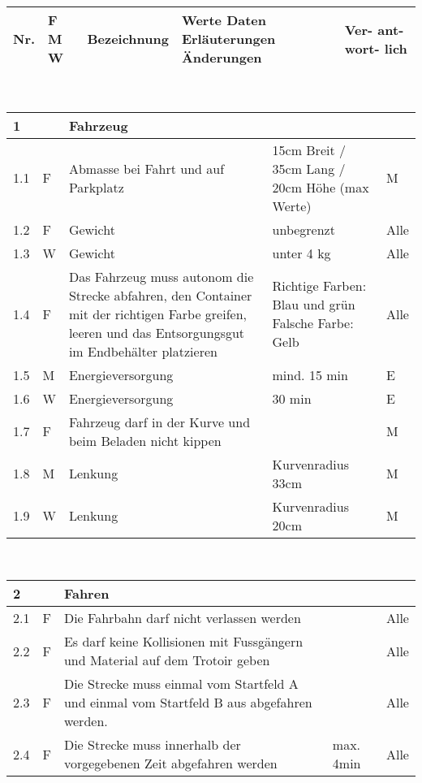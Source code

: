 \begin{center}
\begin{tabular}{|p{1cm}|p{0.5cm}|p{5cm}|p{5cm}|p{1.5cm}|}\hline
\textbf{Nr.} & \textbf{F M W} & \textbf{Bezeichnung} & \textbf{Werte Daten Erläuterungen Änderungen} & \textbf{Ver- ant- wort- lich}\\\hline
\end{tabular}\\[0.3cm]
\begin{tabular}{|p{1cm}|p{0.5cm}|p{5cm}|p{5cm}|p{1.5cm}|}\hline
 \textbf{1} & & \textbf{Fahrzeug} & & \\\hline
 1.1 & F & Abmasse bei Fahrt und auf Parkplatz & 15cm Breit / 35cm Lang / 20cm Höhe (max Werte) & M\\ \hline
 1.2 & F & Gewicht & unbegrenzt & Alle\\\hline
 1.3 & W & Gewicht & unter 4 kg & Alle\\\hline
 1.4 & F & Das Fahrzeug muss autonom die Strecke abfahren, den Container mit der richtigen Farbe greifen, leeren und das Entsorgungsgut im Endbehälter platzieren   & Richtige Farben: Blau und grün Falsche Farbe: Gelb & Alle\\\hline
 1.5 & M & Energieversorgung & mind. 15 min & E \\\hline
 1.6 & W & Energieversorgung & 30 min & E \\\hline
 1.7 & F & Fahrzeug darf in der Kurve und beim Beladen nicht kippen & & M \\\hline
 1.8 & M & Lenkung & Kurvenradius 33cm & M \\\hline
 1.9 & W & Lenkung & Kurvenradius 20cm & M \\\hline
\end{tabular}\\[0.3cm]
\begin{tabular}{|p{1cm}|p{0.5cm}|p{5cm}|p{5cm}|p{1.5cm}|}\hline
 \textbf{2} & & \textbf{Fahren} & & \\\hline
 2.1 & F & Die Fahrbahn darf nicht verlassen werden & & Alle\\\hline
 2.2 & F & Es darf keine Kollisionen mit Fussgängern und Material auf dem Trotoir geben & & Alle \\\hline
 2.3 & F & Die Strecke muss einmal vom Startfeld A und einmal vom Startfeld B aus abgefahren werden. & & Alle\\\hline
 2.4 & F & Die Strecke muss innerhalb der vorgegebenen Zeit abgefahren werden & max. 4min & Alle\\\hline

\end{tabular}
\end{center}
